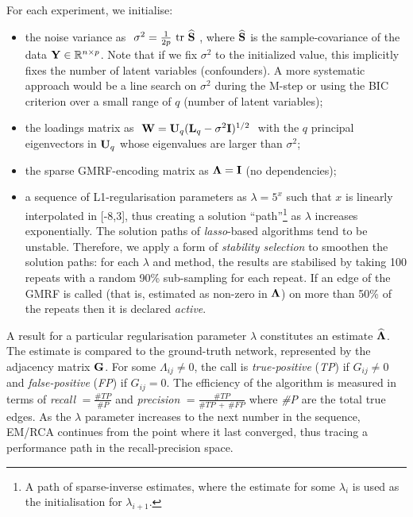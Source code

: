       For each experiment, we initialise:
      \begin{itemize}
        \item the noise variance as $~\sigma^2 = \tfrac{1}{2p}~\textrm{tr}~\widehat{\mathbf{S}}~$, where $\widehat{\mathbf{S}}$ is the sample-covariance of the data $\mathbf{Y} \in \mathbb{R}^{n \times p}$. Note that if we fix $\sigma^2$ to the initialized value, this implicitly fixes the number of latent variables (confounders). %
        A more systematic approach would be a line search on $\sigma^2$ during the M-step or using the BIC criterion over a small range of $q$ (number of latent variables);
        \item the loadings matrix as $~\mathbf{W} = \mathbf{U}_q(\mathbf{L}_q - \sigma^2\mathbf{I})^{1/2}~$ with the $q$ principal eigenvectors in $\mathbf{U}_q$ whose eigenvalues are larger than $\sigma^2$;
        \item the sparse GMRF-encoding matrix as $\mathbf{\Lambda} = \mathbf{I}$ (no dependencies);
        \item a sequence of L1-regularisation parameters as $\lambda = 5^x$ such that $x$ is linearly interpolated in [-8,3], thus creating a solution ``path''\footnote{A path of sparse-inverse estimates,
        where the estimate for some $\lambda_i$ is used as the initialisation for $\lambda_{i+1}$.}
        as $\lambda$ increases exponentially. The solution paths of \textit{lasso}-based algorithms tend to be unstable. Therefore, we apply a form of \textit{stability selection} \citep{Meinshausen:stability10} to smoothen the solution paths: for each $\lambda$ and method, the results are stabilised by taking 100 repeats with a random 90\% sub-sampling for each repeat. If an edge of the GMRF is called (that is, estimated as non-zero in $\mathbf{\Lambda}$) on more than 50\% of the repeats then it is declared \textit{active}.
      \end{itemize}
      A result for a particular regularisation parameter $\lambda$ constitutes an estimate $\widehat{\mathbf{\Lambda}}$. The estimate is compared to the ground-truth network, represented by the adjacency matrix $\mathbf{G}$. For some $\Lambda_{ij} \neq 0$, the call is \textit{true-positive} (\textit{TP}) if $G_{ij} \neq 0$ and \textit{false-positive} (\textit{FP}) if $G_{ij} = 0$. The efficiency of the algorithm is measured in terms of \textit{recall} $= \frac{\#TP}{\#\textit{P}}$ and \textit{precision} $= \frac{\#TP}{\#TP~+~\#FP}$ where \textit{\#P} are the total true edges. As the $\lambda$ parameter increases to the next number in the sequence, EM/RCA continues from the point where it last converged, thus tracing a performance path in the recall-precision space.


